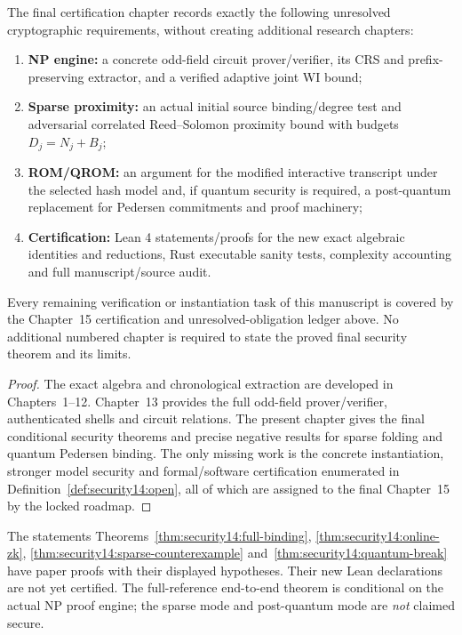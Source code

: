\begin{definition}\label{def:security14:open}
The final certification
chapter records exactly
the following unresolved
cryptographic requirements,
without creating additional
research chapters:
\begin{enumerate}[label=\textup{(\roman*)}]
\item \textbf{NP engine:}
a concrete odd-field
circuit prover/verifier,
its CRS and
prefix-preserving extractor,
and a verified
adaptive joint WI bound;
\item \textbf{Sparse proximity:}
an actual initial source
binding/degree test and
adversarial correlated
Reed--Solomon proximity
bound with budgets
$D_j=N_j+B_j$;
\item \textbf{ROM/QROM:
} an argument for
the modified interactive
transcript under the
selected hash model
and, if quantum security
is required, a
post-quantum replacement
for Pedersen commitments
and proof machinery;
\item \textbf{Certification:}
Lean 4 statements/proofs
for the new exact algebraic
identities and reductions,
Rust executable
sanity tests, complexity
accounting and
full manuscript/source audit.
\end{enumerate}
\end{definition}

\begin{proposition}\label{prop:security14:locked}
Every remaining
verification or
instantiation task
of this manuscript
is covered by the
Chapter~15 certification
and unresolved-obligation
ledger above.
No additional numbered
chapter is required to
state the proved final
security theorem and
its limits.
\end{proposition}
\begin{proof}
The exact algebra and
chronological extraction
are developed in
Chapters~1--12.
Chapter~13 provides
the full odd-field
prover/verifier,
authenticated shells
and circuit relations.
The present chapter
gives the final
conditional security
theorems and precise
negative results for
sparse folding and
quantum Pedersen binding.
The only missing work
is the concrete
instantiation, stronger
model security and
formal/software
certification enumerated
in
Definition~\ref{def:security14:open},
all of which are
assigned to the final
Chapter~15 by
the locked roadmap.
\end{proof}

\begin{remark}
The statements
Theorems~\ref{thm:security14:full-binding},
\ref{thm:security14:online-zk},
\ref{thm:security14:sparse-counterexample}
and~\ref{thm:security14:quantum-break}
have paper proofs with
their displayed hypotheses.
Their new Lean declarations
are not yet certified.
The full-reference
end-to-end theorem is
conditional on the
actual NP proof engine;
the sparse mode and
post-quantum mode
are \emph{not}
claimed secure.
\end{remark}
